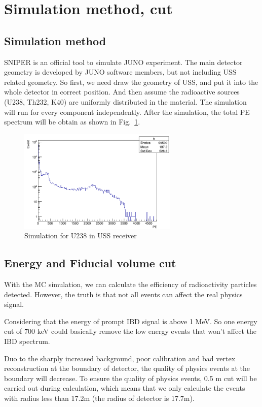\documentclass[review,number,sort&compress]{elsarticle}
\begin{document}
\section{Simulation method, cut}
\subsection{Simulation method}
SNIPER is an official tool to simulate JUNO experiment. The main detector geometry is developed by JUNO software members, but not including USS related geometry. So first, we need draw the geometry of USS, and put it into the whole detector in correct position. And then assume the radioactive sources (U238, Th232, K40) are uniformly distributed in the material. The simulation will run for every component independently. After the simulation, the total PE spectrum will be obtain as shown in Fig.~\ref{USS:Rece:U238}.

\begin{figure}
	\centering
	\includegraphics[width=3in]{U238_USS_receiver.png}
	\caption{Simulation for U238 in USS receiver}
	\label{USS:Rece:U238}
\end{figure}

\subsection{Energy and Fiducial volume cut}


With the MC simulation, we can calculate the efficiency of radioactivity particles detected.
However, the truth is that not all events can affect the real physics signal. 

Considering that the energy of prompt IBD signal is above 1 MeV.
So one energy cut of 700 keV could basically remove 
the low energy events that won't affect the IBD spectrum.

Duo to the sharply increased background, poor calibration and bad vertex reconstruction at the boundary of detector, 
the quality of physics events at the boundary will decrease.
To ensure the quality of physics events, 0.5 m cut will be carried out during calculation, which means that we only calculate the events with radius less than 17.2m (the radius of detector is 17.7m).
\end{document}
